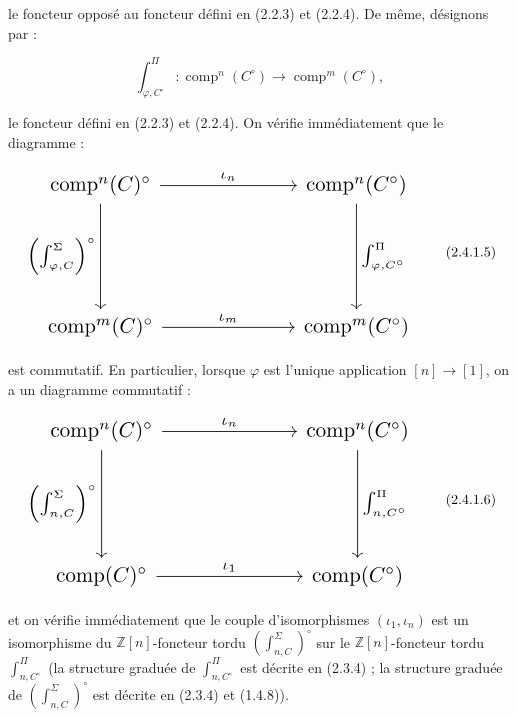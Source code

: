 %
le foncteur opposé au foncteur défini en (2.2.3) et (2.2.4). De
même, désignons par :

\begin{equation}
  \int_{\varphi,C^\circ}^{\Pi}\colon
  \operatorname{comp}^{n}(C^\circ)
  \longrightarrow
  \operatorname{comp}^{m}(C^\circ),
  \tag{2.4.1.4}
\end{equation}

le foncteur défini en (2.2.3) et (2.2.4). On vérifie immédiatement
que le diagramme :

\begin{equation}
  \resizebox{0.82\textwidth}{!}{%
    $\begin{tikzcd}[ampersand replacement=\&,column sep=6.5em,row sep=5.2em]
      \operatorname{comp}^{n}(C)^\circ
        \arrow[r,"\iota_n"]
        \arrow[d,"{\left(\int_{\varphi,C}^{\Sigma}\right)^\circ}"']
        \& \operatorname{comp}^{n}(C^\circ)
          \arrow[d,"{\int_{\varphi,C^\circ}^{\Pi}}"] \\
      \operatorname{comp}^{m}(C)^\circ
        \arrow[r,"\iota_m"]
        \& \operatorname{comp}^{m}(C^\circ)
    \end{tikzcd}$%
  }
  \tag{2.4.1.5}
\end{equation}

est commutatif. En particulier, lorsque $\varphi$ est l'unique application
$[n]\longrightarrow[1]$, on a un diagramme commutatif :

\begin{equation}
  \resizebox{0.82\textwidth}{!}{%
    $\begin{tikzcd}[ampersand replacement=\&,column sep=6.5em,row sep=5.2em]
      \operatorname{comp}^{n}(C)^\circ
        \arrow[r,"\iota_n"]
        \arrow[d,"{\left(\int_{n,C}^{\Sigma}\right)^\circ}"']
        \& \operatorname{comp}^{n}(C^\circ)
          \arrow[d,"{\int_{n,C^\circ}^{\Pi}}"] \\
      \operatorname{comp}(C)^\circ
        \arrow[r,"\iota_1"]
        \& \operatorname{comp}(C^\circ)
    \end{tikzcd}$%
  }
  \tag{2.4.1.6}
\end{equation}

et on vérifie immédiatement que le couple d'isomorphismes
$(\iota_1,\iota_n)$ est un isomorphisme du $\mathbb Z[n]$-foncteur tordu
$\left(\int_{n,C}^{\Sigma}\right)^\circ$ sur le $\mathbb Z[n]$-foncteur
tordu $\int_{n,C^\circ}^{\Pi}$ (la structure graduée de
$\int_{n,C^\circ}^{\Pi}$ est décrite en (2.3.4) ; la structure graduée de
$\left(\int_{n,C}^{\Sigma}\right)^\circ$ est décrite en (2.3.4) et
(1.4.8)).

